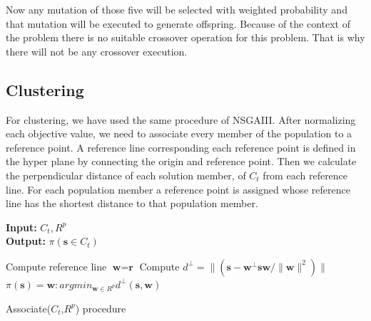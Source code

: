 \documentclass[letterpaper, 10 pt, conference]{ieeeconf}  %
\begin{document}


Now any mutation of those five will be selected with weighted probability and that mutation will be executed to generate offspring. Because of the context of the problem there is no suitable crossover operation for this problem. That is why there will not be any crossover execution.

\subsection{Clustering}
For clustering, we have used the same procedure of NSGAIII. After normalizing each objective value, we need to associate every member of the population to a reference point. A reference line corresponding each reference point is defined in the hyper plane by connecting the origin and reference point. Then we calculate the perpendicular distance of each solution member, of $C_t$ from each reference line. For each population member a reference point is assigned whose reference line has the shortest distance to that population member. 

\begin{algorithm}[!h]
	
 	\textbf{Input:} $C_t,R^p$\\
 	\textbf{Output:} $\pi(\textbf{s} \in C_t)$
	
 	\begin{algorithmic}[1]
        	\State Compute reference line $\textbf{w}=\textbf{r}$
 		\EndFor
            	\State Compute $d^\perp=\parallel(\textbf{s}-\textbf{w}^\perp \textbf{sw}/\parallel \textbf{w} \parallel ^2)\parallel$
            \EndFor
            \State $\pi(\textbf{s})=\textbf{w}:argmin_{\textbf{w} \in R^p}d^\perp(\textbf{s},\textbf{w})$
      
  
        
        \EndFor
		
	\end{algorithmic} 
	
	\caption{Associate($C_t$,$R^p$) procedure}
	
 	\label{alg:associate}
 \end{algorithm}
\end{document}
